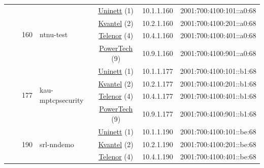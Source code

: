 \begin{small}
\begin{center}
\begin{longtable}{|c|c|c|c|c|c|c|c|}
  &  & \multirow{4}{*}{\tiny{160}} & \multicolumn{1}{|l|}{\multirow{4}{*}{\tiny{ntnu-test}}} & \multicolumn{2}{|c|}{\tiny{\href{https://www.uninett.no}{Uninett} (1)}} & \tiny{10.1.1.160} & \tiny{2001:700:4100:101::a0:68} \\* \cline{5-5}\cline{6-6}\cline{7-7}\cline{8-8}
  &  &  &  & \multicolumn{2}{|c|}{\tiny{\href{http://kvantel.no}{Kvantel} (2)}} & \tiny{10.2.1.160} & \tiny{2001:700:4100:201::a0:68} \\* \cline{5-5}\cline{6-6}\cline{7-7}\cline{8-8}
  &  &  &  & \multicolumn{2}{|c|}{\tiny{\href{https://www.telenor.no}{Telenor} (4)}} & \tiny{10.4.1.160} & \tiny{2001:700:4100:401::a0:68} \\* \cline{5-5}\cline{6-6}\cline{7-7}\cline{8-8}
  &  &  &  & \multicolumn{2}{|c|}{\tiny{\href{http://www.powertech.no}{PowerTech} (9)}} & \tiny{10.9.1.160} & \tiny{2001:700:4100:901::a0:68} \\* \cline{3-3}\cline{4-4}\cline{5-5}\cline{6-6}\cline{7-7}\cline{8-8}
  &  & \multirow{4}{*}{\tiny{177}} & \multicolumn{1}{|l|}{\multirow{4}{*}{\tiny{kau-mptcpsecurity}}} & \multicolumn{2}{|c|}{\tiny{\href{https://www.uninett.no}{Uninett} (1)}} & \tiny{10.1.1.177} & \tiny{2001:700:4100:101::b1:68} \\* \cline{5-5}\cline{6-6}\cline{7-7}\cline{8-8}
  &  &  &  & \multicolumn{2}{|c|}{\tiny{\href{http://kvantel.no}{Kvantel} (2)}} & \tiny{10.2.1.177} & \tiny{2001:700:4100:201::b1:68} \\* \cline{5-5}\cline{6-6}\cline{7-7}\cline{8-8}
  &  &  &  & \multicolumn{2}{|c|}{\tiny{\href{https://www.telenor.no}{Telenor} (4)}} & \tiny{10.4.1.177} & \tiny{2001:700:4100:401::b1:68} \\* \cline{5-5}\cline{6-6}\cline{7-7}\cline{8-8}
  &  &  &  & \multicolumn{2}{|c|}{\tiny{\href{http://www.powertech.no}{PowerTech} (9)}} & \tiny{10.9.1.177} & \tiny{2001:700:4100:901::b1:68} \\* \cline{3-3}\cline{4-4}\cline{5-5}\cline{6-6}\cline{7-7}\cline{8-8}
  &  & \multirow{4}{*}{\tiny{190}} & \multicolumn{1}{|l|}{\multirow{4}{*}{\tiny{srl-nndemo}}} & \multicolumn{2}{|c|}{\tiny{\href{https://www.uninett.no}{Uninett} (1)}} & \tiny{10.1.1.190} & \tiny{2001:700:4100:101::be:68} \\* \cline{5-5}\cline{6-6}\cline{7-7}\cline{8-8}
  &  &  &  & \multicolumn{2}{|c|}{\tiny{\href{http://kvantel.no}{Kvantel} (2)}} & \tiny{10.2.1.190} & \tiny{2001:700:4100:201::be:68} \\* \cline{5-5}\cline{6-6}\cline{7-7}\cline{8-8}
  &  &  &  & \multicolumn{2}{|c|}{\tiny{\href{https://www.telenor.no}{Telenor} (4)}} & \tiny{10.4.1.190} & \tiny{2001:700:4100:401::be:68} \\* \cline{5-5}\cline{6-6}\cline{7-7}\cline{8-8}

\end{longtable}
\end{center}
\end{small}
